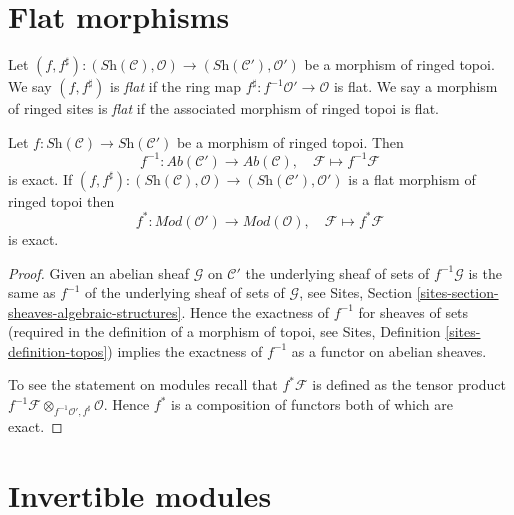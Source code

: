 \section{Flat morphisms}
\label{section-flat-morphisms}

\begin{definition}
\label{definition-flat-morphism}
Let 
$(f, f^\sharp) :
(\textit{Sh}(\mathcal{C}), \mathcal{O})
\longrightarrow
(\textit{Sh}(\mathcal{C}'), \mathcal{O}')$
be a morphism of ringed topoi. We say $(f, f^\sharp)$ is
{\it flat} if the ring map $f^\sharp : f^{-1}\mathcal{O}' \to \mathcal{O}$
is flat. We say a morphism of ringed sites is {\it flat}
if the associated morphism of ringed topoi is flat.
\end{definition}

\begin{lemma}
\label{lemma-flat-pullback-exact}
Let $f : \textit{Sh}(\mathcal{C}) \to \textit{Sh}(\mathcal{C}')$
be a morphism of ringed topoi. Then
$$
f^{-1} : \textit{Ab}(\mathcal{C}') \longrightarrow \textit{Ab}(\mathcal{C}),
\quad
\mathcal{F} \longmapsto f^{-1}\mathcal{F}
$$
is exact. If
$(f, f^\sharp) :
(\textit{Sh}(\mathcal{C}), \mathcal{O})
\to
(\textit{Sh}(\mathcal{C}'), \mathcal{O}')$
is a flat morphism of ringed topoi then
$$
f^* : \textit{Mod}(\mathcal{O}') \longrightarrow \textit{Mod}(\mathcal{O}),
\quad
\mathcal{F} \longmapsto f^*\mathcal{F}
$$
is exact.
\end{lemma}

\begin{proof}
Given an abelian sheaf $\mathcal{G}$ on $\mathcal{C}'$
the underlying sheaf of sets of $f^{-1}\mathcal{G}$ is the same
as $f^{-1}$ of the underlying sheaf of sets of $\mathcal{G}$, see
Sites, Section \ref{sites-section-sheaves-algebraic-structures}.
Hence the exactness of $f^{-1}$ for sheaves of sets (required in the
definition of a morphism of topoi, see
Sites, Definition \ref{sites-definition-topos})
implies the exactness of $f^{-1}$ as a functor on abelian sheaves.

\medskip\noindent
To see the statement on modules recall that $f^*\mathcal{F}$ is defined
as the tensor product
$f^{-1}\mathcal{F} \otimes_{f^{-1}\mathcal{O}', f^\sharp} \mathcal{O}$.
Hence $f^*$ is a composition of functors both of which are exact.
\end{proof}





\section{Invertible modules}
\label{section-invertible}

